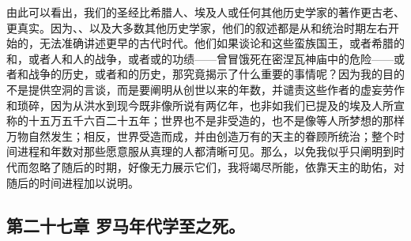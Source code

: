 由此可以看出，我们的圣经比希腊人、埃及人或任何其他历史学家的著作更古老、更真实。因为、、以及大多数其他历史学家，他们的叙述都是从和统治时期左右开始的，无法准确讲述更早的古代时代。他们如果谈论和这些蛮族国王，或者希腊的和，或者人和人的战争，或者或的功绩——曾冒饿死在密涅瓦神庙中的危险——或者和战争的历史，或者和的历史，那究竟揭示了什么重要的事情呢？因为我的目的不是提供空洞的言谈，而是要阐明从创世以来的年数，并谴责这些作者的虚妄劳作和琐碎，因为从洪水到现今既非像所说有两亿年，也非如我们已提及的埃及人所宣称的十五万五千六百二十五年；世界也不是非受造的，也不是像等人所梦想的那样万物自然发生；相反，世界受造而成，并由创造万有的天主的眷顾所统治；整个时间进程和年数对那些愿意服从真理的人都清晰可见。那么，以免我似乎只阐明到时代而忽略了随后的时期，好像无力展示它们，我将竭尽所能，依靠天主的助佑，对随后的时间进程加以说明。\par


\subsection{第二十七章 罗马年代学至之死。}

